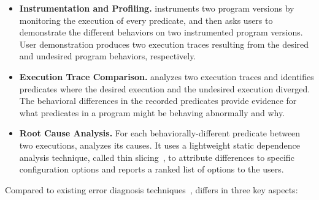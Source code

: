 \begin{itemize}

\item \textbf{Instrumentation and Profiling.} \ourtool
instruments two program versions by monitoring the
execution of every predicate, and then asks users to
demonstrate the different behaviors on two instrumented
program versions. User demonstration produces two execution
traces resulting from the desired and undesired program
behaviors, respectively.

\item \textbf{Execution Trace Comparison.}
\ourtool analyzes two execution traces and identifies 
predicates where the desired execution and the undesired
execution diverged. The behavioral differences in
the recorded predicates provide evidence for what
predicates in a program might be behaving abnormally
and why.

\item \textbf{Root Cause Analysis.} For each behaviorally-different
predicate between two executions, \ourtool analyzes its
causes. It uses a lightweight static dependence analysis
technique, called thin slicing~\cite{}, to attribute
differences to specific configuration options and
reports a ranked list of options to the users.


\end{itemize}

Compared to existing error diagnosis
techniques~\cite{}, \ourtool differs in three
key aspects:

